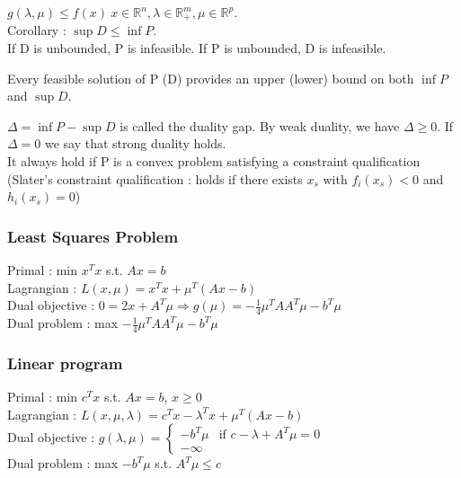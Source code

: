 \documentclass[../main.tex]{subfiles}
\begin{document}
\begin{theorem}
    $g(\lambda, \mu) \leq f(x) \: x\in \mathbb{R}^n, \lambda \in \mathbb{R}_+^m, \mu \in \mathbb{R}^p$.\\

    Corollary : $\sup D \leq \inf P$.\\
    If D is unbounded, P is infeasible. If P is unbounded, D is infeasible.
\end{theorem}

\warning Every feasible solution of P (D) provides an upper (lower) bound on both $\inf P$ and $\sup D$.\\

\begin{theorem}
    $\Delta = \inf P - \sup D$ is called the duality gap. By weak duality, we have $\Delta \geq 0$. If $\Delta = 0$ we say that strong duality holds.\\
    It always hold if P is a convex problem satisfying a constraint qualification (Slater's constraint qualification : holds if there exists $x_s$ with $f_i(x_s) < 0$ and $h_i(x_s) = 0$)
\end{theorem}

\subsubsection{Least Squares Problem}
Primal : min $x^Tx$ s.t. $Ax = b$\\
Lagrangian : $L(x, \mu) = x^T x + \mu^T (Ax-b)$\\
Dual objective : $0 = 2x + A^T \mu \Rightarrow g(\mu) = -\frac{1}{4} \mu^T AA^T \mu - b^T \mu$\\
Dual problem : max $-\frac{1}{4} \mu^T AA^T \mu - b^T \mu$\\

\subsubsection{Linear program}
Primal : min $c^Tx$ s.t. $Ax=b$, $x\geq 0$\\
Lagrangian : $L(x, \mu, \lambda) = c^Tx - \lambda^T x + \mu^T (Ax-b)$\\
Dual objective : $g(\lambda, \mu) = \begin{cases}
    -b^T \mu & \text{if } c-\lambda + A^T \mu = 0\\
    -\infty
\end{cases}$\\
Dual problem : max $-b^T \mu$ s.t. $A^T \mu \leq c$\\
\end{document}
